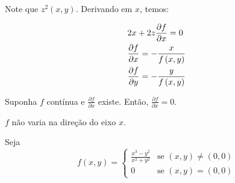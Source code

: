 \documentclass{book}
\begin{document}
\begin{sol}
Note que $z^2 \left( {x,y} \right)$. Derivando em $x$, temos:

\[
\begin{gathered}
2x + 2z\frac{{\partial f}}{{\partial x}} = 0 \hfill \\
      \frac{{\partial f}}{{\partial x}} =  - \frac{x}{{f\left( {x,y} \right)}} \hfill \\
\frac{{\partial f}}{{\partial y}} =  - \frac{y}
{{f\left( {x,y} \right)}} \hfill \\
\end{gathered}
\]

\end{sol}

\begin{ex}
    Suponha $f$ cont\'inua e $\frac{{\partial f}}{{\partial x}}$ existe. Ent\~ao, $\frac{{\partial f}}{{\partial x}} = 0$.
\end{ex}

\begin{sol}
$f$ n\~ao varia na dire\c c\~ao do eixo $x$.
\end{sol}

\begin{ex}
Seja
\begin{equation*}
f(x,y)=\left\{ \begin{array}{cl}\displaystyle
        \frac{{x^3  - y^2 }}{{x^2  + y^2 }} & \textrm{se }\left( {x,y} \right) \ne \left( {0,0} \right)\\
        0 & \textrm{se }\left( {x,y} \right) = \left( {0,0} \right)\end{array}\right.
\end{equation*}
\end{ex}
\end{document}
